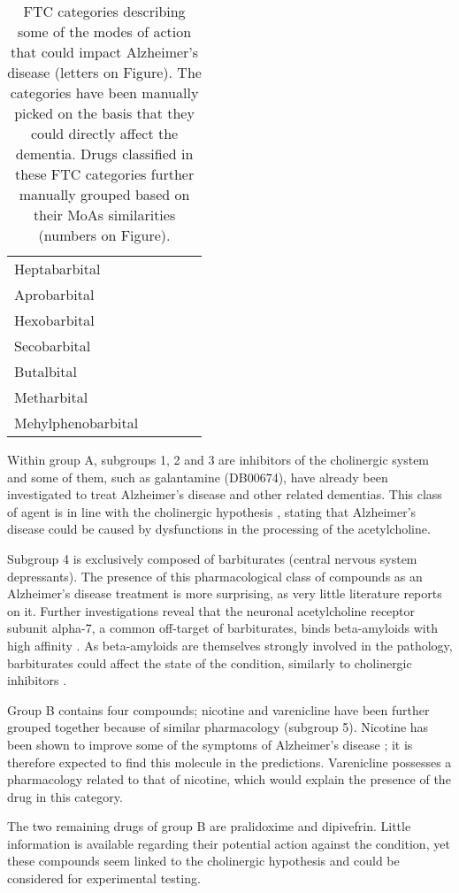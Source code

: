 \begin{table}[htbp]
\begin{tabular}{|p{2.5cm}|p{2.5cm}|p{2.5cm}|p{2.5cm}|p{2.5cm}|}
Heptabarbital &  &  &  &  \\ 
Aprobarbital &  &  &  &  \\ 
Hexobarbital &  &  &  &  \\ 
Secobarbital &  &  &  &  \\ 
Butalbital &  &  &  &  \\ 
Metharbital &  &  &  &  \\ 
Mehylphenobarbital &  &  &  &  \\ \hline
\end{tabular}
\caption{FTC categories describing some of the modes of 
action that could impact Alzheimer's disease (letters on Figure). The categories have been manually picked on the basis that they could directly affect
the dementia. Drugs classified in these FTC categories further 
manually grouped based on their MoAs similarities (numbers on Figure).}
\label{table:alz}
\end{table}

Within group A, subgroups 1, 2 and 3 are inhibitors of the cholinergic system and some of them, such as galantamine (DB00674), have  already been investigated to treat Alzheimer’s disease and other related dementias. This class of agent is in line with the cholinergic hypothesis \citep{babic1999cholinergic}, stating that Alzheimer’s disease could be caused by dysfunctions in the processing of the acetylcholine.

Subgroup 4 is exclusively composed of barbiturates (central nervous system depressants). The presence of this pharmacological class of compounds as an Alzheimer’s disease treatment is more surprising, as very little literature reports on it. Further investigations reveal that the neuronal acetylcholine receptor subunit alpha-7, a common off-target of barbiturates, binds beta-amyloids with high affinity \citep{wang2000amyloid}. As beta-amyloids are themselves strongly involved in the pathology, barbiturates could affect the state of the condition, similarly to cholinergic inhibitors \citep{wang2000amyloid}.

Group B contains four compounds; nicotine and varenicline have been further grouped together because of similar pharmacology (subgroup 5). Nicotine has been shown to improve some of the symptoms of Alzheimer’s disease \citep{jones1992effects}; it is therefore expected to find this molecule in the predictions. Varenicline possesses a pharmacology related to that of nicotine, which would explain the presence of the drug in this category.

The two remaining drugs of group B are pralidoxime and dipivefrin. Little information is available regarding their potential action against the condition, yet these compounds seem linked to the cholinergic hypothesis and could be considered for experimental testing.

